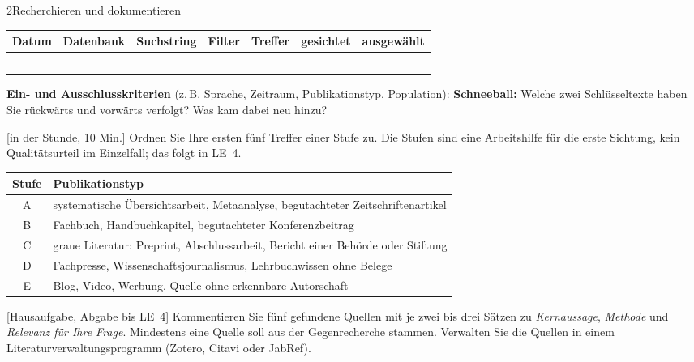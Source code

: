 \begin{uebungsblattb}{2}{Recherchieren und dokumentieren}
\begin{center}
\small
\renewcommand{\arraystretch}{2.4}
\begin{tabular}{|p{}|p{}|p{}|p{}|p{}|p{}|p{}|}
\hline
\textbf{Datum} & \textbf{Datenbank} & \textbf{Suchstring} & \textbf{Filter} &
\textbf{Tref\-fer} & \textbf{ge\-sich\-tet} & \textbf{aus\-ge\-wählt} \\ \hline
 & & & & & & \\ \hline
 & & & & & & \\ \hline
 & & & & & & \\ \hline
 & & & & & & \\ \hline
 & & & & & & \\ \hline
\end{tabular}
\end{center}
\noindent\textbf{Ein- und Ausschlusskriterien} (z.\,B. Sprache, Zeitraum,
Publikationstyp, Population):
\noindent\textbf{Schneeball:} Welche zwei Schlüsseltexte haben Sie rückwärts
und vorwärts verfolgt? Was kam dabei neu hinzu?

[in der Stunde, 10 Min.]
Ordnen Sie Ihre ersten fünf Treffer einer Stufe zu. Die Stufen sind eine
Arbeitshilfe für die erste Sichtung, kein Qualitätsurteil im Einzelfall; das
folgt in LE~4.

\begin{center}
\small
\begin{tabular}{cp{}}
\toprule
\textbf{Stufe} & \textbf{Publikationstyp} \\
\midrule
A & systematische Übersichtsarbeit, Metaanalyse, begutachteter Zeitschriftenartikel \\
B & Fachbuch, Handbuchkapitel, begutachteter Konferenzbeitrag \\
C & graue Literatur: Preprint, Abschlussarbeit, Bericht einer Behörde oder Stiftung \\
D & Fachpresse, Wissenschaftsjournalismus, Lehrbuchwissen ohne Belege \\
E & Blog, Video, Werbung, Quelle ohne erkennbare Autorschaft \\
\bottomrule
\end{tabular}
\end{center}

[Hausaufgabe, Abgabe bis LE~4]
Kommentieren Sie fünf gefundene Quellen mit je zwei bis drei Sätzen zu
\emph{Kernaussage}, \emph{Methode} und \emph{Relevanz für Ihre Frage}.
Mindestens eine Quelle soll aus der Gegenrecherche stammen. Verwalten Sie die
Quellen in einem Literaturverwaltungsprogramm (Zotero, Citavi oder JabRef).


\end{uebungsblattb}

